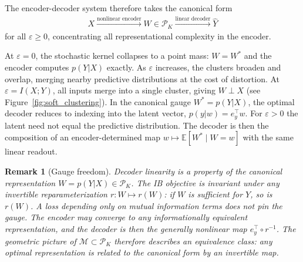\documentclass[11pt]{article}
\newtheorem{remark}{Remark}
\begin{document}
The encoder-decoder system therefore takes the canonical form
\begin{align}
    X \xrightarrow{\text{nonlinear encoder}} W\in\mathcal{P}_K
    \xrightarrow{\text{linear decoder}} \hat{Y}
    \label{eq:canonical}
\end{align}
for all $\varepsilon\geq 0$, concentrating all representational
complexity in the encoder.

At $\varepsilon=0$, the stochastic kernel collapses to a point mass:
$W=W^*$ and the encoder computes $p(Y|X)$ exactly.
As $\varepsilon$ increases, the clusters broaden and overlap, merging
nearby predictive distributions at the cost of distortion.
At $\varepsilon=I(X;Y)$, all inputs merge into a single cluster,
giving $W\perp X$ (see Figure~\ref{fig:soft_clustering}).
In the canonical gauge $W^*=p(Y|X)$,
the optimal decoder reduces to indexing into the latent vector,
$p(y|w)=e_y^\top w$. For $\varepsilon>0$ the latent need not equal
the predictive distribution. The decoder is then the composition of an
encoder-determined map $w\mapsto\mathbb{E}[W^*\mid W=w]$ with the same
linear readout.

\begin{remark}[Gauge freedom]
\label{rem:gauge_decoder}
Decoder linearity is a property of the canonical representation
$W=p(Y|X)\in\mathcal{P}_K$.
The IB objective is invariant under any invertible reparameterization
$r\colon W\mapsto r(W)$: if $W$ is sufficient for $Y$, so is $r(W)$.
A loss depending only on mutual information terms does not pin the
gauge. The encoder may converge to any informationally equivalent
representation, and the decoder is then the generally nonlinear map
$e_y^\top\circ r^{-1}$.
The geometric picture of $\mathcal{M}\subset\mathcal{P}_K$ therefore
describes an \emph{equivalence class}: any optimal representation is
related to the canonical form by an invertible map.
\end{remark}
\end{document}
